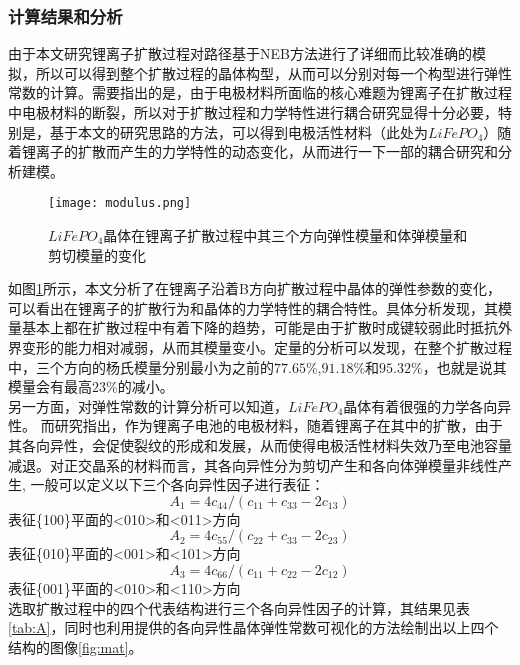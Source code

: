 \subsubsection{计算结果和分析}
由于本文研究锂离子扩散过程对路径基于NEB方法进行了详细而比较准确的模拟，所以可以得到整个扩散过程的晶体构型，从而可以分别对每一个构型进行弹性常数的计算。需要指出的是，由于电极材料所面临的核心难题为锂离子在扩散过程中电极材料的断裂，所以对于扩散过程和力学特性进行耦合研究显得十分必要，特别是，基于本文的研究思路的方法，可以得到电极活性材料（此处为$LiFePO_4$）随着锂离子的扩散而产生的力学特性的动态变化，从而进行一下一部的耦合研究和分析建模。\\
\begin{figure}
	\centering   
	\texttt{[image: modulus.png]}
	\caption{$LiFePO_4$晶体在锂离子扩散过程中其三个方向弹性模量和体弹模量和剪切模量的变化} 
	\label{fig:modulus}
\end{figure}
\indent 如图\ref{fig:modulus}所示，本文分析了在锂离子沿着B方向扩散过程中晶体的弹性参数的变化，可以看出在锂离子的扩散行为和晶体的力学特性的耦合特性。具体分析发现，其模量基本上都在扩散过程中有着下降的趋势，可能是由于扩散时成键较弱此时抵抗外界变形的能力相对减弱，从而其模量变小。定量的分析可以发现，在整个扩散过程中，三个方向的杨氏模量分别最小为之前的$77.65\%$,$91.18\%$和$95.32\%$，也就是说其模量会有最高$23\%$的减小。\\
\indent 另一方面，对弹性常数的计算分析可以知道，$LiFePO_4$晶体有着很强的力学各向异性。 而研究指出，作为锂离子电池的电极材料，随着锂离子在其中的扩散，由于其各向异性，会促使裂纹的形成和发展\cite{Tvergaard1988Microcracking,Rice1992Dislocation}，从而使得电极活性材料失效乃至电池容量减退。对正交晶系的材料而言，其各向异性分为剪切产生和各向体弹模量非线性产生,
一般可以定义以下三个各向异性因子进行表征\cite{Ranganathan2008Universal,Ravindran1998Density}：
\begin{equation}
A_1 = 4c_{44}/(c_{11} + c_{33} -2c_{13})
\end{equation}
表征\{100\}平面的<010>和<011>方向
\begin{equation}
A_2 = 4c_{55}/(c_{22} + c_{33} -2c_{23})
\end{equation}
表征\{010\}平面的<001>和<101>方向
\begin{equation}
A_3 = 4c_{66}/(c_{11} + c_{22} -2c_{12})
\end{equation}
表征\{001\}平面的<010>和<110>方向\\
\indent 选取扩散过程中的四个代表结构进行三个各向异性因子的计算，其结果见表\ref{tab:A}，同时也利用\cite{jerkwin}提供的各向异性晶体弹性常数可视化的方法绘制出以上四个结构的图像\ref{fig:mat}。

